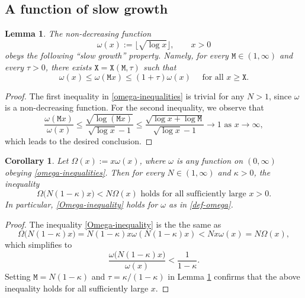 \documentclass[12pt, twoside]{article}
\newtheorem{lemma}[theorem]{Lemma}
\newtheorem{corollary}[theorem]{Corollary}
\theoremstyle{definition}
\numberwithin{equation}{section}
\begin{document}
\subsection{A function of slow growth}
\begin{lemma} \label{omega-lemma} 
The non-decreasing function 
\begin{equation}  \omega(x) := \lfloor  \sqrt{\log x} \rfloor, \qquad x > 0 \label{def-omega}  \end{equation}  
obeys the following ``slow growth'' property. Namely, for every $\mathtt M \in (1, \infty)$ and every $\tau > 0$, there exists $\mathtt X = \mathtt X(\mathtt M, \tau)$ such that 
\begin{equation} \label{omega-inequalities} 
\omega(x) \leq \omega(\mathtt M x) \leq (1 + \tau) \omega(x) \quad \text{ for all } x \geq \mathtt X. 
\end{equation}  
\end{lemma} 
\begin{proof}
The first inequality in \eqref{omega-inequalities} is trivial for any $N > 1$, since $\omega$ is a non-decreasing function. For the second inequality, we observe that 
\[ \frac{\omega(\mathtt M x)}{\omega(x)} \leq \frac{\sqrt{\log (\mathtt M x)}}{\sqrt{\log x}-1} \leq \frac{\sqrt{\log x + \log \mathtt M}}{\sqrt{\log x} - 1}  \rightarrow 1 \text{ as } x \rightarrow \infty, \]
which leads to the desired conclusion. 
\end{proof} 
\begin{corollary} \label{Omega-cor} 
Let $\Omega(x) := x \omega(x)$, where $\omega$ is any function on $(0,\infty)$ obeying \eqref{omega-inequalities}. Then for every $N \in (1, \infty)$ and $\kappa > 0$, the inequality
\begin{equation} \label{Omega-inequality}
\Omega \bigl(N(1 - \kappa)x \bigr) < N \Omega(x) \text{ holds for all sufficiently large $x > 0$.}
\end{equation}  
In particular, \eqref{Omega-inequality} holds for $\omega$ as in \eqref{def-omega}.
\end{corollary}
\begin{proof}
The inequality \eqref{Omega-inequality} is the the same as
\[ \Omega \bigl(N(1 - \kappa) x\bigr) = N(1-\kappa)x \omega(N(1 - \kappa)x)  < Nx \omega(x) = N \Omega(x), \]  which simplifies to  
\[ \frac{\omega \bigl(N(1- \kappa)x \bigr)}{\omega(x)} < \frac{1}{1 - \kappa}. \]
Setting $\mathtt M = N(1 - \kappa)$ and $\tau = {\kappa}/{(1 - \kappa)}$ in Lemma \ref{omega-lemma} confirms that the above inequality holds for all sufficiently large $x$. 
\end{proof}
\end{document}
